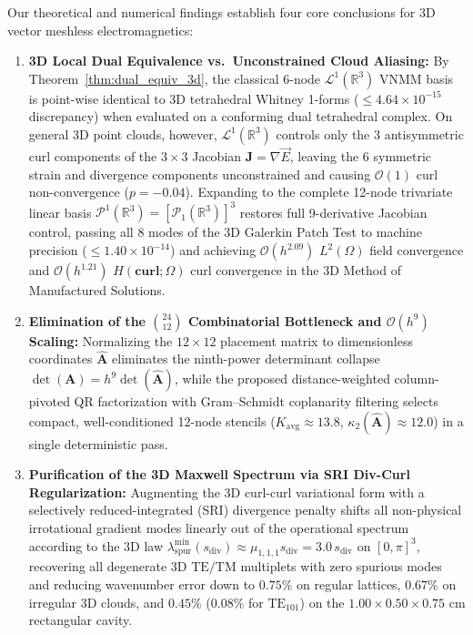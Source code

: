 \documentclass[preprint,12pt]{elsarticle}
\newcommand{\R}{\mathbb{R}}
\newcommand{\Hcurl}{H(\mathbf{curl};\Omega)}
\begin{document}
Our theoretical and numerical findings establish four core conclusions for 3D vector meshless electromagnetics:
\begin{enumerate}
    \item \textbf{3D Local Dual Equivalence vs.\ Unconstrained Cloud Aliasing:} By Theorem~\ref{thm:dual_equiv_3d}, the classical 6-node $\mathcal{L}^1(\R^3)$ VNMM basis is point-wise identical to 3D tetrahedral Whitney 1-forms ($\le 4.64\times 10^{-15}$ discrepancy) when evaluated on a conforming dual tetrahedral complex. On general 3D point clouds, however, $\mathcal{L}^1(\R^3)$ controls only the 3 antisymmetric curl components of the $3\times 3$ Jacobian $\mathbf{J} = \nabla\vec{E}$, leaving the 6 symmetric strain and divergence components unconstrained and causing $\mathcal{O}(1)$ curl non-convergence ($p = -0.04$). Expanding to the complete 12-node trivariate linear basis $\mathcal{P}^1(\R^3) = [\mathcal{P}_1(\R^3)]^3$ restores full 9-derivative Jacobian control, passing all 8 modes of the 3D Galerkin Patch Test to machine precision ($\le 1.40\times 10^{-14}$) and achieving $\mathcal{O}(h^{2.09})$ $L^2(\Omega)$ field convergence and $\mathcal{O}(h^{1.21})$ $\Hcurl$ curl convergence in the 3D Method of Manufactured Solutions.
    \item \textbf{Elimination of the $\binom{24}{12}$ Combinatorial Bottleneck and $\mathcal{O}(h^9)$ Scaling:} Normalizing the $12\times 12$ placement matrix to dimensionless coordinates $\widehat{\mathbf{A}}$ eliminates the ninth-power determinant collapse $\det(\mathbf{A}) = h^9 \det(\widehat{\mathbf{A}})$, while the proposed distance-weighted column-pivoted QR factorization with Gram--Schmidt coplanarity filtering selects compact, well-conditioned 12-node stencils ($K_{\text{avg}} \approx 13.8$, $\kappa_2(\widehat{\mathbf{A}}) \approx 12.0$) in a single deterministic pass.
    \item \textbf{Purification of the 3D Maxwell Spectrum via SRI Div-Curl Regularization:} Augmenting the 3D curl-curl variational form with a selectively reduced-integrated (SRI) divergence penalty shifts all non-physical irrotational gradient modes linearly out of the operational spectrum according to the 3D law $\lambda_{\text{spur}}^{\min}(s_{\text{div}}) \approx \mu_{1,1,1}s_{\text{div}} = 3.0\,s_{\text{div}}$ on $[0,\pi]^3$, recovering all degenerate 3D $\text{TE}/\text{TM}$ multiplets with zero spurious modes and reducing wavenumber error down to $0.75\%$ on regular lattices, $0.67\%$ on irregular 3D clouds, and $0.45\%$ ($0.08\%$ for $\text{TE}_{101}$) on the $1.00\times 0.50\times 0.75\text{ cm}$ rectangular cavity.
\end{enumerate}
\end{document}
